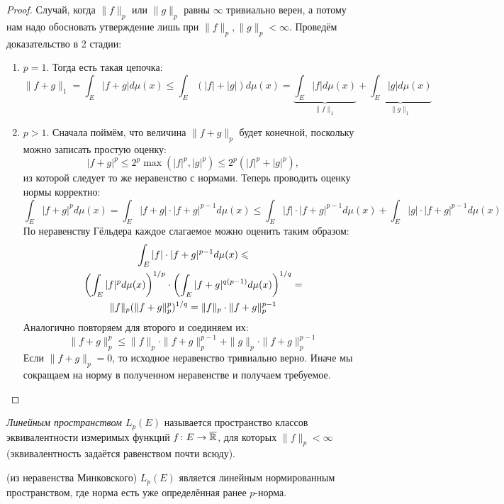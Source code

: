 \begin{proof}
	Случай, когда $\|f\|_p$ или $\|g\|_p$ равны $\infty$ тривиально верен, а потому нам надо обосновать утверждение лишь при $\|f\|_p, \|g\|_p < \infty$. Проведём доказательство в 2 стадии:
	\begin{enumerate}
		\item $p = 1$. Тогда есть такая цепочка:
		\[
			\|f + g\|_1 = \int_E |f + g|d\mu(x) \le \int_E (|f| + |g|)d\mu(x) = \underbrace{\int_E |f|d\mu(x)}_{\|f\|_1} + \underbrace{\int_E |g|d\mu(x)}_{\|g\|_1}
		\]
		
		\item $p > 1$. Сначала поймём, что величина $\|f + g\|_p$ будет конечной, поскольку можно записать простую оценку:
		\[
			|f + g|^p \leq 2^p\max(|f|^p, |g|^p) \leq 2^p(|f|^p + |g|^p),
		\]
		из которой следует то же неравенство с нормами. Теперь проводить оценку нормы корректно:
		\[
			\int_E |f + g|^pd\mu(x) = \int_E |f + g| \cdot |f + g|^{p - 1}d\mu(x) \le \int_E |f| \cdot |f + g|^{p - 1}d\mu(x) + \int_E |g| \cdot |f + g|^{p - 1}d\mu(x)
		\]
		По неравенству Гёльдера каждое слагаемое можно оценить таким образом:
		\begin{multline*}
			\int_E |f| \cdot |f + g|^{p - 1}d\mu(x) \leqslant 
			\\
			\left(\int_E |f|^pd\mu(x)\right)^{1 / p} \cdot \left(\int_E |f + g|^{q(p - 1)}d\mu(x)\right)^{1 / q} =
			\\
			\|f\|_p (\|f + g\|_p^p)^{1 / q} = \|f\|_p \cdot \|f + g\|_p^{p - 1}
		\end{multline*}
		Аналогично повторяем для второго и соединяем их:
		\[
			\|f + g\|_p^p \le \|f\|_p \cdot \|f + g\|_p^{p - 1} + \|g\|_p \cdot \|f + g\|_p^{p - 1}
		\]
		Если $\|f + g\|_p = 0$, то исходное неравенство тривиально верно. Иначе мы сокращаем на норму в полученном неравенстве и получаем требуемое.
	\end{enumerate}
\end{proof}

\begin{definition}
	\textit{Линейным пространством $L_p(E)$} называется пространство классов эквивалентности измеримых функций $f \colon E \to \overline{\mathbb{R}}$, для которых $\|f\|_p < \infty$ (эквивалентность задаётся равенством почти всюду).
\end{definition}

\begin{corollary} (из неравенства Минковского)
	$L_p(E)$ является линейным нормированным пространством, где норма есть уже определённая ранее $p$-норма.
\end{corollary}

